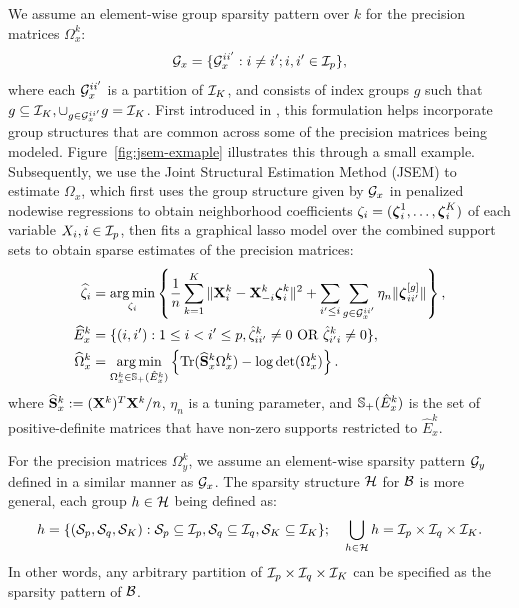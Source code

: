 We assume an element-wise group sparsity pattern over $k$ for the precision matrices $\Omega_x^k$:
%
\[
{\cal{G}}_x = \{ {\cal{G}}_x^{ii'}: i \neq i'; i, i' \in {\cal{I}}_p \},
\]
%
where each ${\cal{G}}_x^{ii'}$ is a partition of ${\cal{I}}_K$, and consists of index groups $g$ such that $g \subseteq {\cal{I}}_K, \cup_{g \in {\cal{G}}_x^{ii'}} g = {\cal{I}}_K$. First introduced in \citet{MaMichailidis15}, this formulation helps incorporate group structures that are common across some of the precision matrices being modeled. Figure~\ref{fig:jsem-exmaple} illustrates this through a small example. Subsequently, we use the Joint Structural Estimation Method (JSEM) \citep{MaMichailidis15} to estimate $\Omega_x$, which first uses the group structure given by ${\cal{G}}_x$ in penalized nodewise regressions \citep{MeisenBuhlmann06} to obtain neighborhood coefficients $\zeta_i = ({\boldsymbol{\zeta}}_i^1, \ldots, {\boldsymbol{\zeta}}_i^K)$ of each variable $X_i, i \in {\cal{I}}_p$, then fits a graphical lasso model over the combined support sets to obtain sparse estimates of the precision matrices:
%
\begin{align}\label{eqn:jsem-model}
\widehat \zeta_i &= \operatorname*{arg\,min}_{\zeta_i} \left\{
\frac{1}{n} \sum_{k=1}^K \| {\mathbf{X}}_i^k - {\mathbf{X}}_{-i}^k {\boldsymbol{\zeta}}_i^k \|^2 +
\sum_{i' \leq i} \sum_{g \in {\cal{G}}_x^{ii'}} \eta_n \| {\boldsymbol{\zeta}}_{ii'}^{[g]} \| \right\}, \notag\\
\widehat E_x^k &= \{(i,i'): 1 \leq i < i' \leq p, \hat \zeta_{ii'}^k \neq 0 \text{ OR } \hat \zeta_{i'i}^k \neq 0 \}, \notag\\
\widehat \Omega_x^k &= \operatorname*{arg\,min}_{\Omega_x^k \in {\mathbb{S}}_+ (\hat E_x^k)}
\left\{ \operatorname*{Tr} (\widehat {{\mathbf{S}}}_x^k \Omega_x^k ) - \log \det (\Omega_x^k) \right\}.
\end{align}
%
where $\widehat {{\mathbf{S}}}_x^k := ({\mathbf{X}}^k)^T {\mathbf{X}}^k/n$, $\eta_n$ is a tuning parameter, and ${\mathbb{S}}_+ (\hat E_x^k)$ is the set of positive-definite matrices that have non-zero supports restricted to $\hat E_x^k$.

For the precision matrices $\Omega_y^k$, we assume an element-wise sparsity pattern ${\cal{G}}_y$ defined in a similar manner as ${\cal{G}}_x$. The sparsity structure ${\cal{H}}$ for ${\cal{B}}$ is more general, each group $h \in {\cal{H}}$ being defined as:
%
$$
h = \{ ({\cal{S}}_p, {\cal{S}}_q, {\cal{S}}_K): {\cal{S}}_p \subseteq {\cal{I}}_p, {\cal{S}}_q \subseteq {\cal{I}}_q, {\cal{S}}_K \subseteq {\cal{I}}_K \}
; \quad \bigcup_{h \in {\cal{H}}} h = {\cal{I}}_p \times {\cal{I}}_q \times {\cal{I}}_K.
$$
%
In other words, any arbitrary partition of ${\cal{I}}_p \times {\cal{I}}_q \times {\cal{I}}_K$ can be specified as the sparsity pattern of ${\cal{B}}$.


